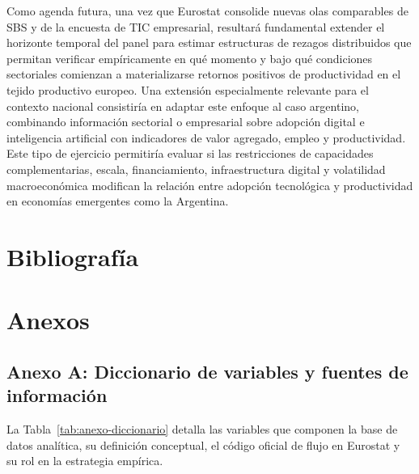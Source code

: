 \documentclass[12pt,a4paper]{article}
\begin{document}
Como agenda futura, una vez que Eurostat consolide nuevas olas comparables de SBS y de la encuesta de TIC empresarial, resultará fundamental extender el horizonte temporal del panel para estimar estructuras de rezagos distribuidos que permitan verificar empíricamente en qué momento y bajo qué condiciones sectoriales comienzan a materializarse retornos positivos de productividad en el tejido productivo europeo. Una extensión especialmente relevante para el contexto nacional consistiría en adaptar este enfoque al caso argentino, combinando información sectorial o empresarial sobre adopción digital e inteligencia artificial con indicadores de valor agregado, empleo y productividad. Este tipo de ejercicio permitiría evaluar si las restricciones de capacidades complementarias, escala, financiamiento, infraestructura digital y volatilidad macroeconómica modifican la relación entre adopción tecnológica y productividad en economías emergentes como la Argentina.

\clearpage

\section{Bibliografía}

\renewcommand{\refname}{}





\newpage

\section*{Anexos}


\subsection*{Anexo A: Diccionario de variables y fuentes de información}

\label{anexo:diccionario}

La Tabla~\ref{tab:anexo-diccionario} detalla las variables que componen la base de datos analítica, su definición conceptual, el código oficial de flujo en Eurostat y su rol en la estrategia empírica.
\end{document}
